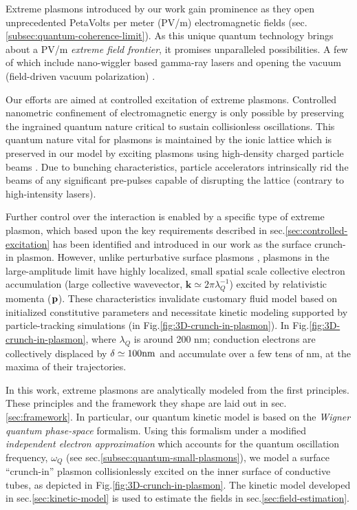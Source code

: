 \documentclass[aps,twocolumn,notitlepage,superscriptaddress]{revtex4-1}
\renewcommand\vec{\mathbf}
\begin{document}
Extreme plasmons introduced by our work gain prominence as they open unprecedented PetaVolts per meter (PV/m) electromagnetic fields \cite{plasmonics-ieee-2021, spie-2021, nanofocusing-2022} (sec. \ref{subsec:quantum-coherence-limit}). As this unique quantum technology brings about a PV/m {\it extreme field frontier}, it promises unparalleled possibilities. A few of which include nano-wiggler based gamma-ray lasers \cite{plasmonics-ieee-2021, ginzburg-2003, pct-2021} and opening the vacuum (field-driven vacuum polarization) \cite{jinst-2023, schwinger-limit}.

Our efforts \cite{slac-2023,slac-2022, slac-2020} are aimed at controlled excitation of extreme plasmons. Controlled nanometric confinement of electromagnetic energy is only possible by preserving the ingrained quantum nature critical to sustain collisionless oscillations. This quantum nature vital for plasmons is maintained by the ionic lattice which is preserved in our model by exciting plasmons using high-density charged particle beams \cite{plasmonics-ieee-2021, pct-2021}. Due to bunching characteristics, particle accelerators intrinsically rid the beams of any significant pre-pulses capable of disrupting the lattice (contrary to high-intensity lasers).

Further control over the interaction is enabled by a specific type of extreme plasmon, which based upon the key requirements described in sec.\ref{sec:controlled-excitation} has been identified and introduced in our work as the surface crunch-in plasmon. However, unlike perturbative surface plasmons \cite{Ritchie-surface-plasmon}, plasmons in the large-amplitude limit have highly localized, small spatial scale collective electron accumulation (large collective wavevector, $\vec{k}\simeq 2\pi\lambda_Q^{-1}$) excited by relativistic  momenta ($\bf p$). These characteristics invalidate customary fluid model based on initialized constitutive parameters and necessitate kinetic modeling supported by particle-tracking simulations (in Fig.\ref{fig:3D-crunch-in-plasmon}). In Fig.\ref{fig:3D-crunch-in-plasmon}, where $\lambda_Q$ is around 200 nm; conduction electrons are collectively displaced by $\delta \simeq 100 {\rm nm}$ and accumulate over a few tens of nm, at the maxima of their trajectories. 

In this work, extreme plasmons are analytically modeled from the first principles. These principles and the framework they shape are laid out in sec.\ref{sec:framework}. In particular, our quantum kinetic model is based on the {\it Wigner quantum phase-space} formalism. Using this formalism under a modified {\it independent electron approximation} which accounts for the quantum oscillation frequency, $\omega_Q$ (see sec.\ref{subsec:quantum-small-plasmons}), we model a surface ``crunch-in'' plasmon collisionlessly excited on the inner surface of conductive tubes, as depicted in Fig.\ref{fig:3D-crunch-in-plasmon}. The kinetic model developed in sec.\ref{sec:kinetic-model} is used to estimate the fields in sec.\ref{sec:field-estimation}.
\end{document}
